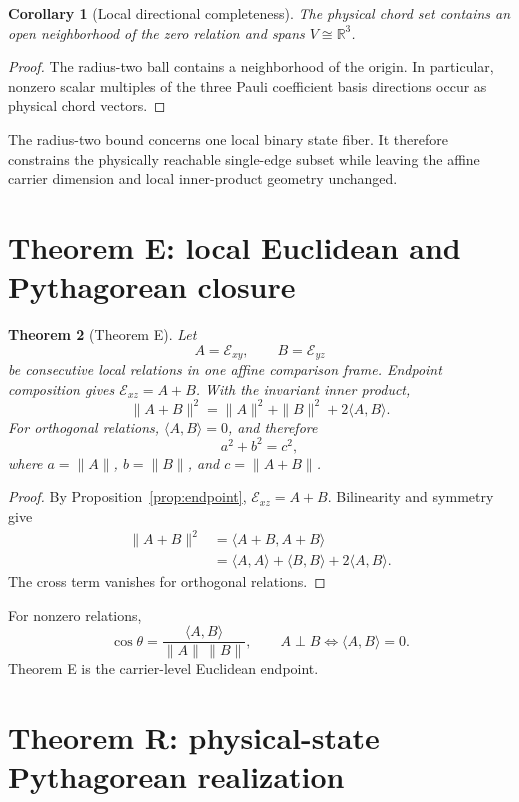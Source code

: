 \documentclass[12pt,a4paper]{article}
\newtheorem{theorem}{Theorem}[section]
\newtheorem{corollary}[theorem]{Corollary}
\newcommand{\R}{\mathbb{R}}
\newcommand{\Erel}{\mathcal{E}}
\begin{document}
\begin{corollary}[Local directional completeness]\label{cor:span}
The physical chord set contains an open neighborhood of the zero relation and spans $V\cong\R^3$.
\end{corollary}

\begin{proof}
The radius-two ball contains a neighborhood of the origin. In particular, nonzero scalar multiples of the three Pauli coefficient basis directions occur as physical chord vectors.
\end{proof}

The radius-two bound concerns one local binary state fiber. It therefore constrains the physically reachable single-edge subset while leaving the affine carrier dimension and local inner-product geometry unchanged.

\section{Theorem E: local Euclidean and Pythagorean closure}

\begin{theorem}[Theorem E]\label{thm:pyth}
Let
\[
A=\Erel_{xy},\qquad B=\Erel_{yz}
\]
be consecutive local relations in one affine comparison frame. Endpoint composition gives $\Erel_{xz}=A+B$. With the invariant inner product,
\[
\|A+B\|^2=\|A\|^2+\|B\|^2+2\langle A,B\rangle.
\]
For orthogonal relations, $\langle A,B\rangle=0$, and therefore
\[
\boxed{a^2+b^2=c^2},
\]
where $a=\|A\|$, $b=\|B\|$, and $c=\|A+B\|$.
\end{theorem}

\begin{proof}
By Proposition~\ref{prop:endpoint}, $\Erel_{xz}=A+B$. Bilinearity and symmetry give
\begin{align*}
\|A+B\|^2
&=\langle A+B,A+B\rangle\\
&=\langle A,A\rangle+\langle B,B\rangle+2\langle A,B\rangle.
\end{align*}
The cross term vanishes for orthogonal relations.
\end{proof}

For nonzero relations,
\[
\boxed{
\cos\theta=\frac{\langle A,B\rangle}{\|A\|\,\|B\|},
\qquad
A\perp B\iff\langle A,B\rangle=0.
}
\]
Theorem E is the carrier-level Euclidean endpoint.

\section{Theorem R: physical-state Pythagorean realization}
\end{document}
